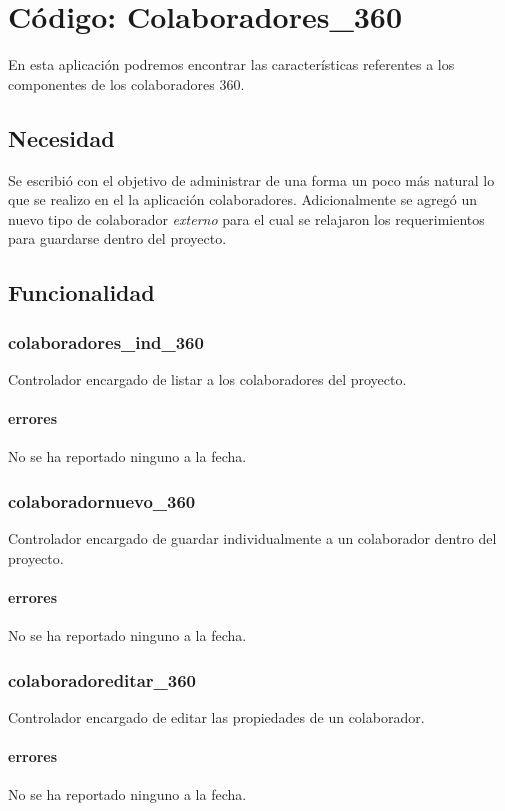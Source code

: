 \documentclass[10pt,a4paper]{book}
\begin{document}
	\chapter{Código: Colaboradores\_360}
	
	En esta aplicación podremos encontrar las características referentes a los componentes de los colaboradores 360.
	
	\section{Necesidad}
	
	Se escribió con el objetivo de administrar de una forma un poco más natural lo que se realizo en el la aplicación colaboradores. Adicionalmente se agregó un nuevo tipo de colaborador \textit{externo} para el cual se relajaron los requerimientos para guardarse dentro del proyecto.

	\section{Funcionalidad}


	\subsection{colaboradores\_ind\_360}
	Controlador encargado de listar a los colaboradores del proyecto.
	\subsubsection{errores}
	No se ha reportado ninguno a la fecha.
	
	\subsection{colaboradornuevo\_360}
	Controlador encargado de guardar individualmente a un colaborador dentro del proyecto.
	\subsubsection{errores}
	No se ha reportado ninguno a la fecha.
	
	\subsection{colaboradoreditar\_360}
	Controlador encargado de editar las propiedades de un colaborador.
	\subsubsection{errores}
	No se ha reportado ninguno a la fecha.
	
\end{document}
